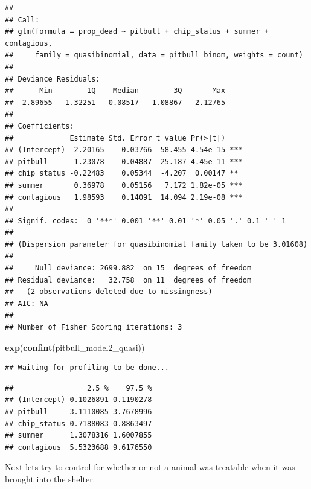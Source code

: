 \documentclass[]{article}
\newenvironment{Shaded}{\begin{snugshade}}{\end{snugshade}}
\newcommand{\KeywordTok}[1]{\textcolor[rgb]{0.13,0.29,0.53}{\textbf{#1}}}
\newcommand{\NormalTok}[1]{#1}
\begin{document}
\begin{verbatim}
## 
## Call:
## glm(formula = prop_dead ~ pitbull + chip_status + summer + contagious, 
##     family = quasibinomial, data = pitbull_binom, weights = count)
## 
## Deviance Residuals: 
##      Min        1Q    Median        3Q       Max  
## -2.89655  -1.32251  -0.08517   1.08867   2.12765  
## 
## Coefficients:
##             Estimate Std. Error t value Pr(>|t|)    
## (Intercept) -2.20165    0.03766 -58.455 4.54e-15 ***
## pitbull      1.23078    0.04887  25.187 4.45e-11 ***
## chip_status -0.22483    0.05344  -4.207  0.00147 ** 
## summer       0.36978    0.05156   7.172 1.82e-05 ***
## contagious   1.98593    0.14091  14.094 2.19e-08 ***
## ---
## Signif. codes:  0 '***' 0.001 '**' 0.01 '*' 0.05 '.' 0.1 ' ' 1
## 
## (Dispersion parameter for quasibinomial family taken to be 3.01608)
## 
##     Null deviance: 2699.882  on 15  degrees of freedom
## Residual deviance:   32.758  on 11  degrees of freedom
##   (2 observations deleted due to missingness)
## AIC: NA
## 
## Number of Fisher Scoring iterations: 3
\end{verbatim}

\begin{Shaded}
\begin{Highlighting}[]
\KeywordTok{exp}\NormalTok{(}\KeywordTok{confint}\NormalTok{(pitbull_model2_quasi))}
\end{Highlighting}
\end{Shaded}

\begin{verbatim}
## Waiting for profiling to be done...
\end{verbatim}

\begin{verbatim}
##                 2.5 %    97.5 %
## (Intercept) 0.1026891 0.1190278
## pitbull     3.1110085 3.7678996
## chip_status 0.7188083 0.8863497
## summer      1.3078316 1.6007855
## contagious  5.5323688 9.6176550
\end{verbatim}

Next lets try to control for whether or not a animal was treatable when
it was brought into the shelter.
\end{document}
